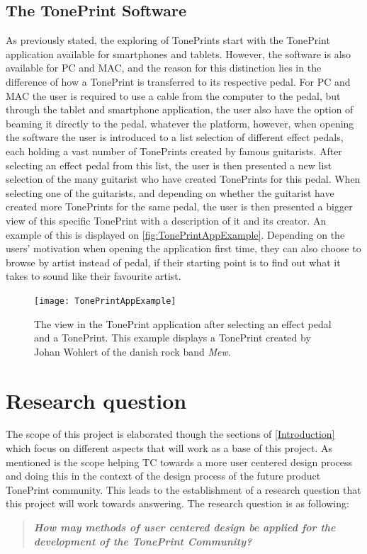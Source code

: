 \subsection{The TonePrint Software}
\label{TonePrintSoftware}
As previously stated, the exploring of TonePrints start with the TonePrint application available for smartphones and tablets. However, the software is also available for PC and MAC, and the reason for this distinction lies in the difference of how a TonePrint is transferred to its respective pedal. For PC and MAC the user is required to use a cable from the computer to the pedal, but through the tablet and smartphone application, the user also have the option of beaming it directly to the pedal. whatever the platform, however, when opening the software the user is introduced to a list selection of different effect pedals, each holding a vast number of TonePrints created by famous guitarists. After selecting an effect pedal from this list, the user is then presented a new list selection of the many guitarist who have created TonePrints for this pedal. When selecting one of the guitarists, and depending on whether the guitarist have created more TonePrints for the same pedal, the user is then presented a bigger view of this specific TonePrint with a description of it and its creator. An example of this is displayed on \autoref{fig:TonePrintAppExample}. Depending on the users' motivation when opening the application first time, they can also choose to browse by artist instead of pedal, if their starting point is to find out what it takes to sound like their favourite artist.
%
\begin{figure}[H]
	\centering
	\texttt{[image: TonePrintAppExample]}
	\caption{The view in the TonePrint application after selecting an effect pedal and a TonePrint. This example displays a TonePrint created by Johan Wohlert of the danish rock band \textit{Mew}.}
	\label{fig:TonePrintAppExample}
\end{figure}

\newpage
%
\section{Research question}
\label{ResearchQuestion}
%
The scope of this project is elaborated though the sections of  \autoref{Introduction} which focus on different aspects that will work as a base of this project. As mentioned is the scope helping TC towards a more user centered design process and doing this in the context of the design process of the future product TonePrint community. This leads to the establishment of a research question that this project will work towards answering. The research question is as following:

\begin{quote}
	\textbf{\textit{How may methods of user centered design be applied for the development of the TonePrint Community?}}
\end{quote}
